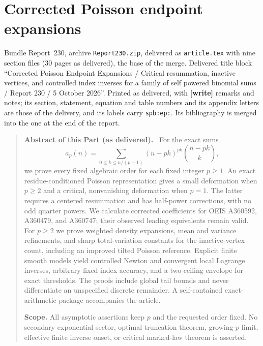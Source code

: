 \documentclass[11pt,letterpaper]{article}
\numberwithin{equation}{section}
\theoremstyle{definition}\newtheorem{definition}[theorem]{Definition}
\theoremstyle{remark}\newtheorem{remark}[theorem]{Remark}
\newcommand{\1}{\mathbf 1}
\newcommand{\file}[1]{\nolinkurl{#1}}
\newenvironment{partabstract}{\begin{quote}\small\noindent\textbf{Abstract of this Part (as delivered).}\ }{\end{quote}}
\newcommand{\partsource}[1]{\par\noindent\begin{minipage}{\textwidth}\small #1\end{minipage}\par\medskip}
\begin{document}
\part{Corrected Poisson endpoint expansions}\label{spb:ep:part}
\partsource{Bundle Report~230, archive \file{Report230.zip}, delivered as \file{article.tex} with nine section files (30 pages as delivered), the base of the merge. Delivered title block ``Corrected Poisson Endpoint Expansions / Critical resummation, inactive vertices, and controlled index inverses for a family of self powered binomial sums / Report 230 / 5 October 2026''. Printed as delivered, with \textbf{[write]} remarks and notes; its section, statement, equation and table numbers and its appendix letters are those of the delivery, and its labels carry \file{spb:ep:}. Its bibliography is merged into the one at the end of the report.}
\begin{partabstract}
For the exact sums
\[
 a_p(n)=\sum_{0\le k\le n/(p+1)}(n-pk)^{pk}\binom{n-pk}{k},
\]
we prove every fixed algebraic order for each fixed integer $p\ge1$.
An exact residue-conditioned Poisson representation gives a small deformation
when $p\ge2$ and a critical, nonvanishing deformation when $p=1$.
The latter requires a centered resummation and has half-power corrections,
with no odd quarter powers. We calculate corrected coefficients for OEIS
A360592, A360479, and A360747; their observed leading equivalents remain valid.
For $p\ge2$ we prove weighted density expansions, mean and variance refinements,
and sharp total-variation constants for the inactive-vertex count, including an
improved tilted Poisson reference. Explicit finite smooth models yield controlled
Newton and convergent local Lagrange inverses, arbitrary fixed index accuracy,
and a two-ceiling envelope for exact thresholds. The proofs include global
tail bounds and never differentiate an unspecified discrete remainder.
A self-contained exact-arithmetic package accompanies the article.

\noindent\textbf{Scope.} All asymptotic assertions keep $p$ and the requested order fixed.
No secondary exponential sector, optimal truncation theorem, growing-$p$ limit,
effective finite inverse onset, or critical marked-law theorem is asserted.
\end{partabstract}









\end{document}
